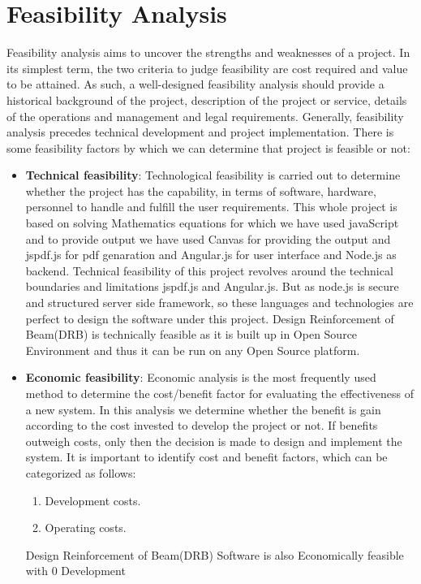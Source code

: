 \section{Feasibility Analysis}
Feasibility analysis aims to uncover the strengths and weaknesses of 
a project. In its simplest term, the two criteria to judge feasibility 
are cost required and value to be attained. As such, a well-designed 
feasibility analysis should provide a historical background of the 
project, description of the project or service, details of the 
operations and management and legal requirements. Generally, feasibility 
analysis precedes technical development and project implementation. 
There is some feasibility factors by which we can determine that 
project is feasible or not:
\begin{itemize}
\item {\bf{Technical feasibility}}: Technological feasibility is carried 
out to determine whether the project has the capability, in terms of 
software, hardware, personnel to handle and fulfill the user 
requirements. This whole project is based on solving Mathematics equations for which we have used javaScript and to provide output we have used Canvas for providing the output and jspdf.js for pdf genaration and Angular.js for user interface and Node.js as backend. Technical feasibility of this project revolves around the technical boundaries and limitations jspdf.js and Angular.js. But as node.js is secure and structured server side framework, so these languages and technologies are perfect to design the software under this project. Design Reinforcement of Beam(DRB) is technically feasible as it is built up in Open 
Source Environment and thus it can be run on any Open Source platform.
\item {\bf{Economic feasibility}}: Economic analysis is the most 
frequently used method to determine the cost/benefit factor for 
evaluating the effectiveness of a new system. In this analysis we 
determine whether the benefit is gain according to the cost invested 
to develop the project or not. If benefits outweigh costs, only then 
the decision is made to design and implement the system. It is 
important to identify cost and benefit factors, which can be categorized 
as follows:
\begin{enumerate}
\item Development costs.
\item Operating costs.
\end{enumerate}
Design Reinforcement of Beam(DRB) Software is also Economically feasible with 0 Development 

\end{itemize}
